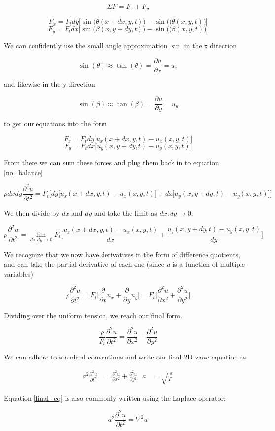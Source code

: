 $$\Sigma F = F_x + F_y$$

$$F_x = F_tdy\Big[\sin\big( \theta (x+dx,y,t) \big) - \sin \big((\theta (x,y,t)\big)\Big]$$
$$F_y = F_tdx\Big[\sin\big( \beta (x,y+dy,t) \big) - \sin \big((\beta (x,y,t)\big)\Big]$$

\noindent We can confidently use the small angle approximation $\sin$ in the x direction

$$ \sin(\theta) \approx \tan(\theta) = \frac{\partial u}{\partial x} = u_x$$

\noindent and likewise in the y direction 

$$ \sin(\beta) \approx \tan(\beta) = \frac{\partial u}{\partial y} = u_y$$

\noindent to get our equations into the form

$$F_x = F_tdy\Big[u_x(x+dx,y,t) - u_x(x,y,t)\Big]$$
$$F_y = F_tdx\Big[u_y(x,y+dy,t) - u_y(x,y,t)\Big]$$

\noindent From there we can sum these forces and plug them back in to equation \ref{no_balance}

$$\rho dxdy \frac{\partial^2u}{\partial t^2} = F_t\bigg[dy\Big[u_x(x+dx,y,t) - u_x(x,y,t)\Big]+dx\Big[u_y(x,y+dy,t) - u_y(x,y,t)\Big] \bigg]$$

\noindent We then divide by $dx$ and $dy$ and take the limit as $dx,dy \to 0$:

$$\rho\frac{\partial^2u}{\partial t^2} = \lim_{dx,dy\to 0} F_t \bigg[ \frac{u_x(x+dx,y,t) - u_x(x,y,t)}{dx} + \frac{u_y(x,y+dy,t) - u_y(x,y,t)}{dy} \bigg]$$

\noindent We recognize that we now have derivatives in the form of difference quotients, and can take the partial derivative of each one (since $u$ is a function of multiple variables)

\begin{equation}
\rho \frac{\partial^2u}{\partial t^2} = F_t\bigg[\frac{\partial}{\partial x}u_x + \frac{\partial}{\partial y}u_y \bigg] = F_t\bigg[\frac{\partial^2 u}{\partial x^2} + \frac{\partial^2 u}{\partial y^2}\bigg]
\end{equation}

\noindent Dividing over the uniform  tension, we reach our final form.

\begin{equation}
\frac{\rho}{F_t}\frac{\partial^2u}{\partial t^2} = \frac{\partial^2 u}{\partial x^2} + \frac{\partial^2 u}{\partial y^2}
\end{equation}

\noindent We can adhere to standard conventions and write our final 2D wave equation as 


\begin{align}
a^2 \frac{\partial^2u}{\partial t^2} &= \frac{\partial^2 u}{\partial x^2} + \frac{\partial^2 u}{\partial y^2} & a &= \sqrt{\frac{\rho}{F_t}}
\label{final_eq}
\end{align}

\noindent Equation \ref{final_eq} is also commonly written using the Laplace operator:

\begin{equation}
a^2 \frac{\partial^2u}{\partial t^2} = \nabla^2 u
\end{equation}